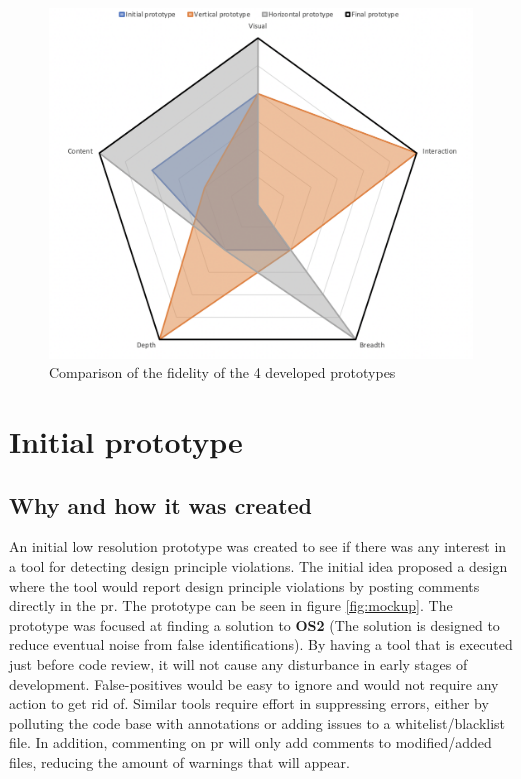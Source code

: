 \documentclass{report}
\begin{document}
\begin{figure}[h!]
    \centering
    \includegraphics[width=\linewidth]{../images/radar-chart.png}
    \caption{Comparison of the fidelity of the 4 developed prototypes}
    \label{fig:radar-chart}
\end{figure}


\section{Initial prototype}
\subsection*{Why and how it was created}
An initial low resolution prototype was created to see if there was any interest in a tool for detecting design principle violations. The initial idea proposed a design where the tool would report design principle violations by posting comments directly in the \gls{pr}. The prototype can be seen in figure \ref{fig:mockup}. The prototype was focused at finding a solution to \textbf{OS2} (The solution is designed to reduce eventual noise from false identifications). By having a tool that is executed just before code review, it will not cause any disturbance in early stages of development. False-positives would be easy to ignore and would not require any action to get rid of. Similar tools require effort in suppressing errors, either by polluting the code base with annotations or adding issues to a whitelist/blacklist file. In addition, commenting on \gls{pr} will only add comments to modified/added files, reducing the amount of warnings that will appear.  
\end{document}
